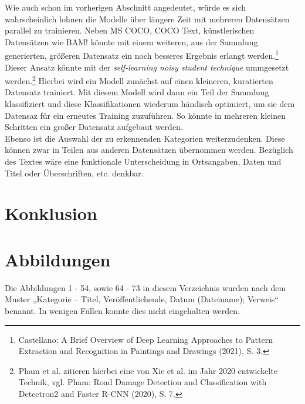\documentclass[a4paper,12pt,ngerman]{article}
\begin{document}
Wie auch schon im vorherigen Abschnitt angedeutet, würde es sich wahrscheinlich lohnen die Modelle über längere Zeit mit mehreren Datensätzen parallel zu trainieren. Neben MS COCO, COCO Text, künstlerischen Datensätzen wie BAM! könnte mit einem weiteren, aus der Sammlung generierten, größeren Datensatz ein noch besseres Ergebnis erlangt werden.\footnote{Castellano: A Brief Overview of Deep Learning Approaches to Pattern Extraction and Recognition in Paintings and Drawings (2021), S. 3.} \\
Dieser Ansatz könnte mit der \textit{self-learning noisy student technique} ummgesetzt werden.\footnote{Pham et al. zitieren hierbei eine von Xie et al. im Jahr 2020 entwickelte Technik, vgl. Pham: Road Damage Detection and Classification with Detectron2 and Faster R-CNN (2020), S. 7.} Hierbei wird ein Modell zunächst auf einen kleineren, kuratierten Datensatz trainiert. Mit diesem Modell wird dann ein Teil der Sammlung klassifiziert und diese Klassifikationen wiederum händisch optimiert, um sie dem Datensaz für ein erneutes Training zuzuführen. So könnte in mehreren kleinen Schritten ein großer Datensatz aufgebaut werden. \\
Ebenso ist die Auswahl der zu erkennenden Kategorien weiterzudenken. Diese können zwar in Teilen aus anderen Datensätzen übernommen werden. Bezüglich des Textes wäre eine funktionale Unterscheidung in Ortsangaben, Daten und Titel oder Überschriften, etc. denkbar.

\section{Konklusion}



\newpage

\section{Abbildungen}
Die Abbildungen 1 - 54, sowie 64 - 73 in diesem Verzeichnis wurden nach dem Muster „Kategorie – Titel, Veröffentlichende, Datum (Dateiname); Verweis“ benannt. In wenigen Fällen konnte dies nicht eingehalten werden. \\
\end{document}
